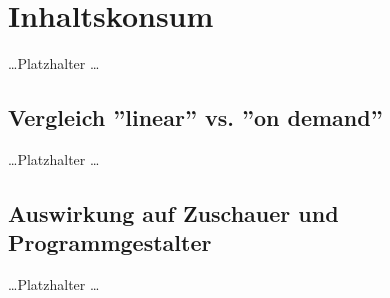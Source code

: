 \newpage
\section{Inhaltskonsum}
  \dots Platzhalter \dots
\subsection{Vergleich ''linear'' vs. ''on demand''}
  \dots Platzhalter \dots
\subsection{Auswirkung auf Zuschauer und Programmgestalter}
  \dots Platzhalter \dots

